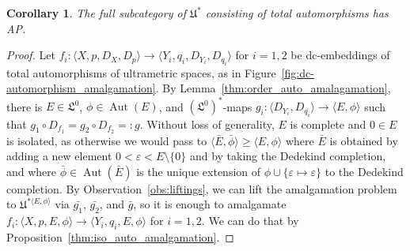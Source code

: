 \documentclass[10pt,a4paper]{article}
\newtheorem{wn}[tw]{Corollary}
\theoremstyle{definition}
\theoremstyle{remark}
\newcommand \set [1]{\{#1\}}
\newcommand \seq [1]{\langle #1 \rangle}
\newcommand \maps {\colon} %
\newcommand \cmp {\circ} %
\newcommand \eps {\varepsilon}
\newcommand \Lin {\mathfrak{L}}
\newcommand \Ult {\mathfrak{U}}
\newcommand \Aut {\operatorname{Aut}}
\let \aut \Aut
\begin{document}
\begin{wn} \label{thm:dc_auto_amalgamation}
    The full subcategory of $\Ult^*$ consisting of total automorphisms has AP.
\end{wn}
\begin{proof}
    Let $f_i\maps \seq{X, p, D_X, D_p} \to \seq{Y_i, q_i, D_{Y_i}, D_{q_i}}$ for $i = 1, 2$ be dc-embeddings of total automorphisms of ultrametric spaces, as in Figure~\ref{fig:dc-automorphism_amalgamation}.
    By Lemma~\ref{thm:order_auto_amalagamation}, there is $E \in \Lin^0$, $\phi \in \aut(E)$, and $(\Lin^0)^*$-maps $g_i\maps \seq{D_{Y_i}, D_{q_i}} \to \seq{E, \phi}$ such that $g_1 \cmp D_{f_1} = g_2 \cmp D_{f_2} =: g$.
    Without loss of generality, $E$ is complete and $0 \in E$ is isolated, as otherwise we would pass to $\seq{\bar{E}, \bar{\phi}} \geq \seq{E, \phi}$ where $\bar{E}$ is obtained by adding a new element $0 < \eps < E \setminus \set{0}$ and by taking the Dedekind completion, and where $\bar{\phi} \in \aut(\bar{E})$ is the unique extension of $\phi \cup \set{\eps \mapsto \eps}$ to the Dedekind completion.
    By Observation~\ref{obs:liftings}, we can lift the amalgamation problem to $\Ult^{*\seq{E, \phi}}$ via $\bar{g_1}$, $\bar{g_2}$, and $\bar{g}$, so it is enough to amalgamate $f_i\maps \seq{X, p, E, \phi} \to \seq{Y_i, q_i, E, \phi}$ for $i = 1, 2$. We can do that by Proposition~\ref{thm:iso_auto_amalgamation}.
\end{proof}
\end{document}
